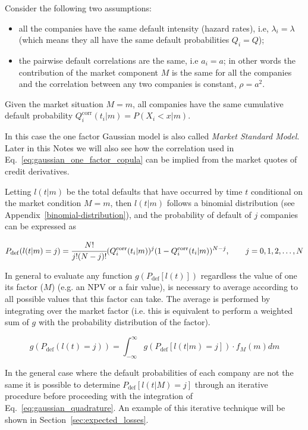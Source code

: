 Consider the following two assumptions:

\begin{itemize}
\tightlist
\item all the companies have the same default intensity (hazard rates), i.e, $\lambda_i = \lambda$ (which means they all have the same default probabilities $Q_i = Q$);
\item the pairwise default correlations are the same, i.e $a_i = a$; in other words the contribution of the market component $M$ is the same for all the companies and the correlation between any two companies is constant, $\rho = a^2$.
\end{itemize}

Given the market situation $M = m$, all companies have the same cumulative default probability $Q_i^{\textrm{corr}}(t_i|m)=P(X_i < x|m)$. 

In this case the one factor Gaussian model is also called \emph{Market Standard Model}. Later in this Notes we will also see how the correlation used in Eq.~\ref{eq:gaussian_one_factor_copula} can be implied from the market quotes of credit derivatives.

Letting $l(t|m)$ be the total defaults that have occurred by time $t$ conditional on the market condition $M = m$, then $l(t|m)$ follows a binomial distribution (see Appendix~\ref{binomial-distribution}), and the probability of default of $j$ companies can be expressed as

\begin{equation}
P_{\mathrm{def}}(l(t|m) = j) = \cfrac{N!}{j!(N-j)!}(Q_i^{\textrm{corr}}(t_i|m))^j(1-Q_i^{\textrm{corr}}(t_i|m))^{N-j},\qquad  j=0, 1, 2,\ldots,N
\end{equation}

In general to evaluate any function $g(P_{\mathrm{def}}[l(t)])$ regardless the value of one its factor ($M$) (e.g. an NPV or a fair value), is necessary to average according to all possible values that this factor can take. The average is performed by integrating over the market factor (i.e. this is equivalent to perform a weighted sum of $g$ with the probability distribution of the factor).  

\begin{equation}
g(P_{\mathrm{def}}(l(t) = j)) = \int_{-\infty}^{\infty}{g(P_{\mathrm{def}}[l(t|m) = j])\cdot f_M(m)dm}
\label{eq:gaussian_quadrature}
\end{equation}

In the general case where the default probabilities of each company are not the same it is possible to determine $P_{\mathrm{def}}[l(t|M)=j]$ through an iterative procedure before proceeding with the integration of Eq.~\ref{eq:gaussian_quadrature}. An example of this iterative technique will be shown in Section~\ref{sec:expected_losses}.

